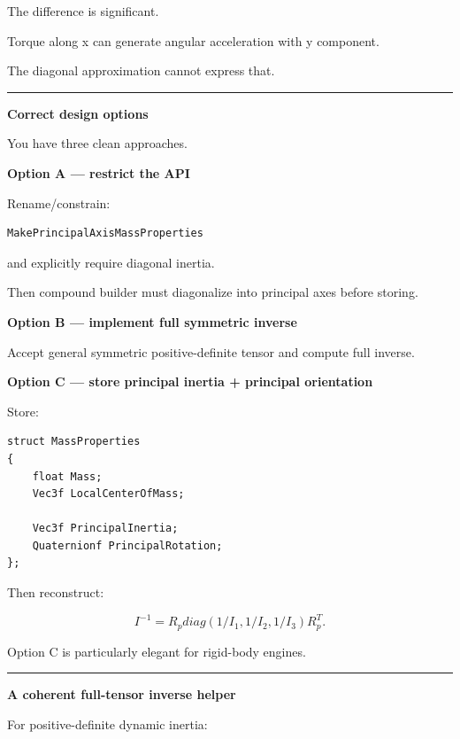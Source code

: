 The difference is significant.

Torque along x can generate angular acceleration with y component.

The diagonal approximation cannot express that.

\begin{center}\rule{0.5\linewidth}{0.5pt}\end{center}

\textbf{Correct design options}

You have three clean approaches.

\textbf{Option A --- restrict the API}

Rename/constrain:

\begin{verbatim}
MakePrincipalAxisMassProperties
\end{verbatim}

and explicitly require diagonal inertia.

Then compound builder must diagonalize into principal axes before storing.

\textbf{Option B --- implement full symmetric inverse}

Accept general symmetric positive-definite tensor and compute full inverse.

\textbf{Option C --- store principal inertia + principal orientation}

Store:

\begin{verbatim}
struct MassProperties
{
    float Mass;
    Vec3f LocalCenterOfMass;

    Vec3f PrincipalInertia;
    Quaternionf PrincipalRotation;
};
\end{verbatim}

Then reconstruct:

\[
I^{-1}
=
R_p
diag(
1/I_1,
1/I_2,
1/I_3)
R_p^T.
\]

Option C is particularly elegant for rigid-body engines.

\begin{center}\rule{0.5\linewidth}{0.5pt}\end{center}

\textbf{A coherent full-tensor inverse helper}

For positive-definite dynamic inertia:

